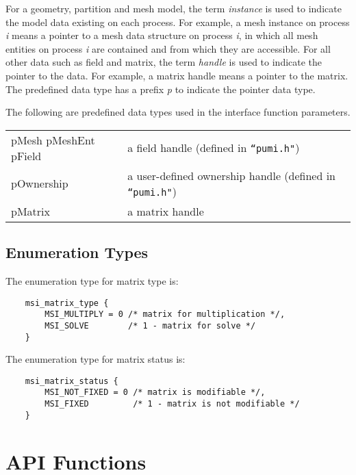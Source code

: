 For a geometry, partition and mesh model, the term \emph{instance} is used to indicate the model data existing on each process. For example, a mesh instance on process \emph{i} means a pointer to a mesh data structure on process \emph{i}, in which all mesh entities on process \emph{i} are contained and from which they are accessible. For all other data such as field and matrix, the term \emph{handle} is used to indicate the pointer to the data. For example, a matrix handle means a pointer to the matrix. The predefined data type has a prefix \emph{p} to indicate the pointer data type.

The following are predefined data types used in the interface function parameters.

\begin{tabular}{lp{14cm}}	
	pMesh
        pMeshEnt 
        pField & 	a field handle (defined in \texttt{``pumi.h"})\\
	pOwnership & 	a user-defined ownership handle (defined in \texttt{``pumi.h"}) \\
 	pMatrix &	a matrix handle \\
\end{tabular}	

\subsection{Enumeration Types}

The enumeration type for matrix type is:

\begin{verbatim}
    msi_matrix_type {
        MSI_MULTIPLY = 0 /* matrix for multiplication */,
        MSI_SOLVE      	 /* 1 - matrix for solve */
    }
\end{verbatim}\vspace{-1cm}\hspace{1cm}

The enumeration type for matrix status is:

\begin{verbatim}
    msi_matrix_status {
        MSI_NOT_FIXED = 0 /* matrix is modifiable */,
        MSI_FIXED         /* 1 - matrix is not modifiable */
    }
\end{verbatim}\vspace{-1cm}\hspace{1cm}

\section{API Functions}

